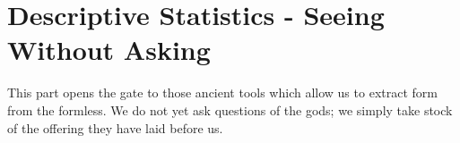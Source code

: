 \part{Descriptive Statistics - Seeing Without Asking}

\IMFellEnglish

This part opens the gate to those ancient tools which allow us to extract form from the formless. We do not yet ask questions of the gods; we simply take stock of the offering they have laid before us.
